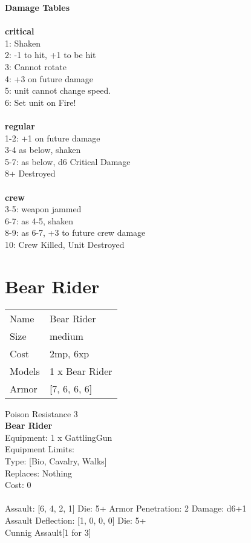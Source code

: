 {\bf Damage Tables} \\
\ \\ {\bf critical } \\
1: Shaken \\
2: -1 to hit, +1 to be hit \\
3: Cannot rotate \\
4: +3 on future damage \\
5: unit cannot change speed. \\
6: Set unit on Fire! \\
\ \\ {\bf regular } \\
1-2: +1 on future damage \\
3-4 as below, shaken \\
5-7: as below, d6 Critical Damage \\
8+ Destroyed \\
\ \\ {\bf crew } \\
3-5: weapon jammed \\
6-7: as 4-5, shaken \\
8-9: as 6-7, +3 to future crew damage \\
10: Crew Killed, Unit Destroyed \\










\pagebreak\pagebreak

\section{ Bear Rider }

\begin{tabular}{ll}
  Name & Bear Rider \\
  Size & medium\\
  Cost & 2mp, 6xp\\
  Models & 1 x Bear Rider\\
  Armor & [7, 6, 6, 6]\\
\end{tabular}

\noindent Poison Resistance 3\\ 


{\bf Bear Rider } \\
Equipment: 1 x GattlingGun \\
Equipment Limits:  \\
Type: [Bio, Cavalry, Walks] \\
Replaces: Nothing \\
Cost: 0\\
\ \\
Assault: [6, 4, 2, 1] Die: 5+ Armor Penetration: 2 Damage: d6+1 \\
Assault Deflection: [1, 0, 0, 0] Die: 5+\\
\indent Cunnig Assault[1 for 3]\\ 
 
